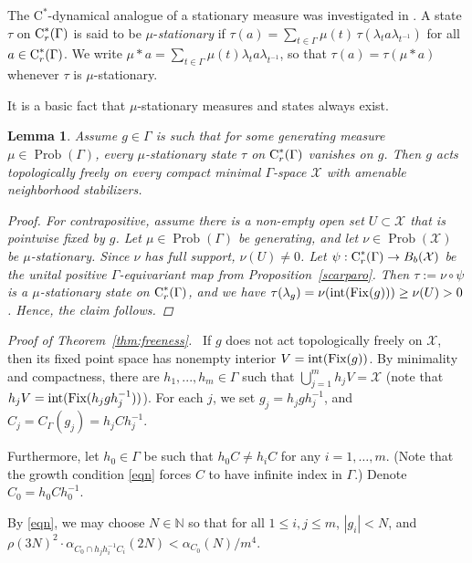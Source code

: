 \documentclass[12pt]{amsart}
\newtheorem{lem}[theorem]{Lemma}
\theoremstyle{definition}
\theoremstyle{remark}
\newcommand{\pr}{\operatorname{Prob}}
\newcommand{\bN}{{\mathbb{N}}}
\newcommand{\G}{\Gamma}
\begin{document}
The $\text{C}^*$-dynamical analogue of a stationary measure was investigated in \cite{hart-kalantar-1}. A state $\tau$ on $\textup{C}^*_r(\G)$ is said to be $\mu$-\textit{stationary} if $\tau(a)=\sum_{t\in\G}\mu(t)\,\tau(\lambda_{t}a\lambda_{t^{-1}})$ for all $a\in \textup{C}^*_r(\G)$. We write $\mu * a = \sum_{t\in\Gamma}\mu(t)\lambda_ta\lambda_{t^{-1}}$, so that $\tau(a) = \tau(\mu * a)$ whenever $\tau$ is $\mu$-stationary.


It is a basic fact that $\mu$-stationary measures and states always exist.

\begin{lem}\label{lem:station-topfree}
Assume $g\in\G$ is such that for some generating measure $\mu\in\pr(\G)$, every $\mu$-stationary state $\tau$ on $\textup{C}^*_r(\G)$ vanishes on $g$. Then $g$ acts topologically freely on every compact minimal $\Gamma$-space $\mathcal{X}$ with amenable neighborhood stabilizers.
\begin{proof}
For contrapositive, assume there is a non-empty open set $U\subset \mathcal{X}$ that is pointwise fixed by $g$. Let $\mu\in\pr(\G)$ be generating, and let $\nu\in\pr(\mathcal{X})$ be $\mu$-stationary. Since $\nu$ has full support, $\nu(U)\neq 0$. Let $\psi: \textup{C}^*_r(\Gamma)\to B_b(\mathcal{X})$ be the unital positive $\Gamma$-equivariant map from Proposition~\ref{scarparo}. Then $\tau:=\nu\circ \psi$ is a $\mu$-stationary state on $\textup{C}^*_r(\Gamma)$, and we have $\tau(\lambda_g)= \nu({\rm int}({\rm Fix}(g)))\ge \nu(U)>0$. Hence, the claim follows.   
\end{proof}
\end{lem}


\medskip

\noindent
{\it Proof of Theorem~\ref{thm:freeness}.}~
If $g$ does not act topologically freely on $\mathcal{X}$, then its fixed point space has nonempty interior $V = {\rm int}(\text{Fix}(g))$. By minimality and compactness, there are $h_1, ..., h_m\in\Gamma$ such that $\bigcup_{j=1}^m h_jV = \mathcal{X}$ (note that $h_jV = {\rm int}(\text{Fix}(h_jgh_j^{-1}))$). For each $j$, we set $g_j = h_jgh_j^{-1}$, and $C_j = C_\G(g_j)=h_jCh_j^{-1}$. 

Furthermore, let $h_0\in\G$ be such that $h_0C\neq h_iC$ for any $i=1, \dots, m$. (Note that the growth condition \eqref{eqn} forces $C$ to have infinite index in $\G$.)
Denote $C_0 = h_0Ch_0^{-1}$.

By \eqref{eqn}, we may choose $N\in \bN$ so that for all $1\le i, j \le m$, $|g_i| < N$, and $\rho(3N)^2\cdot \alpha_{\scriptscriptstyle C_0\cap h_jh_i^{-1}C_i}(2N)< \alpha_{\scriptscriptstyle C_0}(N)/m^4$.
\end{document}
